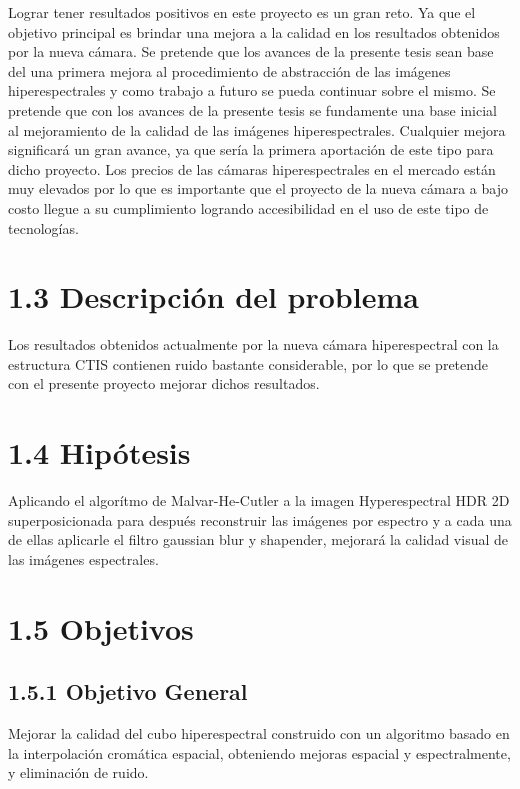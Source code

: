 Lograr tener resultados positivos en este proyecto es un gran reto. Ya que el objetivo principal es brindar una mejora a la calidad en los resultados obtenidos por la nueva cámara.
Se pretende que los avances de la presente tesis sean base del una primera mejora al procedimiento de abstracción de las imágenes hiperespectrales y como trabajo a futuro se pueda continuar sobre el mismo.
Se pretende que con los avances de la presente tesis se fundamente una base inicial al mejoramiento de la calidad de las imágenes hiperespectrales.
Cualquier mejora significará un gran avance, ya que sería la primera aportación de este tipo para dicho proyecto. Los precios de las cámaras hiperespectrales en el mercado están muy elevados por lo que es importante que el proyecto de la nueva cámara a bajo costo llegue a su cumplimiento logrando accesibilidad en el uso de este tipo de tecnologías. 

\section{1.3 Descripción del problema}
Los resultados obtenidos actualmente por la nueva cámara hiperespectral \cite{JairoCamera} con la estructura CTIS contienen ruido bastante considerable, por lo que se pretende con el presente proyecto mejorar dichos resultados.

\section{1.4 Hipótesis}

Aplicando el algorítmo de Malvar-He-Cutler a la imagen Hyperespectral HDR 2D superposicionada para después reconstruir las imágenes por espectro y a cada una de ellas aplicarle el filtro gaussian blur y shapender, mejorará la calidad visual de las imágenes espectrales.

\section{1.5 Objetivos}
\subsection{1.5.1 Objetivo General} 
Mejorar la calidad del cubo hiperespectral construido con un algoritmo basado en la interpolación cromática espacial, obteniendo mejoras espacial y espectralmente, y eliminación de ruido.

